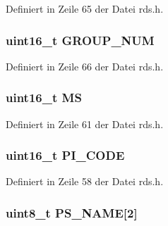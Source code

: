 Definiert in Zeile 65 der Datei rds.\+h.

\hypertarget{structgroup__0a_a9f692e9f76ee88348d426bcd4e9bc70b}{}
\subsubsection[{G\+R\+O\+U\+P\+\_\+\+N\+U\+M}]{\setlength{\rightskip}{0pt plus 5cm}uint16\+\_\+t G\+R\+O\+U\+P\+\_\+\+N\+U\+M}\label{structgroup__0a_a9f692e9f76ee88348d426bcd4e9bc70b}


Definiert in Zeile 66 der Datei rds.\+h.

\hypertarget{structgroup__0a_a0d87191040df43fdd9f67487d0cc1a45}{}
\subsubsection[{M\+S}]{\setlength{\rightskip}{0pt plus 5cm}uint16\+\_\+t M\+S}\label{structgroup__0a_a0d87191040df43fdd9f67487d0cc1a45}


Definiert in Zeile 61 der Datei rds.\+h.

\hypertarget{structgroup__0a_a5cd9b1f6413028425796c1129aa8fd87}{}
\subsubsection[{P\+I\+\_\+\+C\+O\+D\+E}]{\setlength{\rightskip}{0pt plus 5cm}uint16\+\_\+t P\+I\+\_\+\+C\+O\+D\+E}\label{structgroup__0a_a5cd9b1f6413028425796c1129aa8fd87}


Definiert in Zeile 58 der Datei rds.\+h.

\hypertarget{structgroup__0a_a80447425671c19133df16d620705bb09}{}
\subsubsection[{P\+S\+\_\+\+N\+A\+M\+E}]{\setlength{\rightskip}{0pt plus 5cm}uint8\+\_\+t P\+S\+\_\+\+N\+A\+M\+E\mbox{[}2\mbox{]}}\label{structgroup__0a_a80447425671c19133df16d620705bb09}


